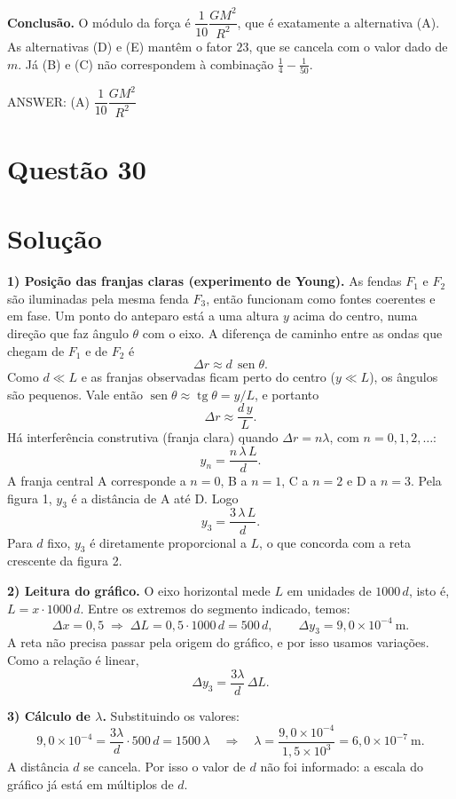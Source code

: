 \documentclass{article}%
\begin{document}
\textbf{Conclusão.} O módulo da força é $\dfrac{1}{10}\dfrac{GM^2}{R^2}$, que é exatamente a alternativa (A). As alternativas (D) e (E) mantêm o fator $23$, que se cancela com o valor dado de $m$. Já (B) e (C) não correspondem à combinação $\tfrac{1}{4} - \tfrac{1}{50}$.

ANSWER: (A) $\dfrac{1}{10}\dfrac{GM^2}{R^2}$%
\newpage%
\section*{Questão 30}

\section*{Solução}

\textbf{1) Posição das franjas claras (experimento de Young).}
As fendas $F_1$ e $F_2$ são iluminadas pela mesma fenda $F_3$, então funcionam como fontes coerentes e em fase. Um ponto do anteparo está a uma altura $y$ acima do centro, numa direção que faz ângulo $\theta$ com o eixo. A diferença de caminho entre as ondas que chegam de $F_1$ e de $F_2$ é
\[
\Delta r \approx d\,\operatorname{sen}\theta .
\]
Como $d \ll L$ e as franjas observadas ficam perto do centro ($y \ll L$), os ângulos são pequenos. Vale então $\operatorname{sen}\theta \approx \operatorname{tg}\theta = y/L$, e portanto
\[
\Delta r \approx \frac{d\,y}{L}.
\]
Há interferência construtiva (franja clara) quando $\Delta r = n\lambda$, com $n = 0, 1, 2, \dots$:
\[
y_n = \frac{n\,\lambda\,L}{d}.
\]
A franja central A corresponde a $n=0$, B a $n=1$, C a $n=2$ e D a $n=3$. Pela figura 1, $y_3$ é a distância de A até D. Logo
\[
y_3 = \frac{3\,\lambda\,L}{d}.
\]
Para $d$ fixo, $y_3$ é diretamente proporcional a $L$, o que concorda com a reta crescente da figura 2.

\textbf{2) Leitura do gráfico.}
O eixo horizontal mede $L$ em unidades de $1000\,d$, isto é, $L = x\cdot 1000\,d$. Entre os extremos do segmento indicado, temos:
\[
\Delta x = 0{,}5 \;\Rightarrow\; \Delta L = 0{,}5\cdot 1000\,d = 500\,d,
\qquad
\Delta y_3 = 9{,}0\times10^{-4}\ \text{m}.
\]
A reta não precisa passar pela origem do gráfico, e por isso usamos variações. Como a relação é linear,
\[
\Delta y_3 = \frac{3\lambda}{d}\,\Delta L .
\]

\textbf{3) Cálculo de $\lambda$.}
Substituindo os valores:
\[
9{,}0\times10^{-4} = \frac{3\lambda}{d}\cdot 500\,d = 1500\,\lambda
\quad\Longrightarrow\quad
\lambda = \frac{9{,}0\times10^{-4}}{1{,}5\times10^{3}} = 6{,}0\times10^{-7}\ \text{m}.
\]
A distância $d$ se cancela. Por isso o valor de $d$ não foi informado: a escala do gráfico já está em múltiplos de $d$.
\end{document}
